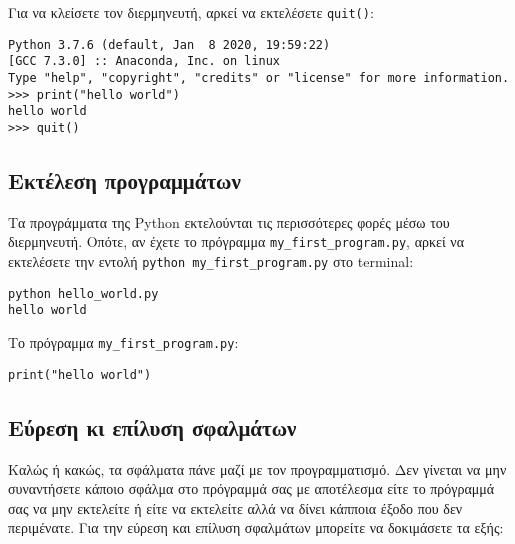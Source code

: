 \documentclass[12pt]{extreport}
\begin{document}
Για να κλείσετε τον διερμηνευτή, αρκεί να εκτελέσετε \lstinline{quit()}:

\begin{lstlisting}[numbers=none]
Python 3.7.6 (default, Jan  8 2020, 19:59:22) 
[GCC 7.3.0] :: Anaconda, Inc. on linux
Type "help", "copyright", "credits" or "license" for more information.
>>> print("hello world")
hello world
>>> quit()
\end{lstlisting}

\subsection{Εκτέλεση προγραμμάτων}

Τα προγράμματα της Python εκτελούνται τις περισσότερες φορές μέσω του διερμηνευτή. Οπότε, αν έχετε το πρόγραμμα \lstinline{my_first_program.py}, αρκεί να εκτελέσετε την εντολή \lstinline{python my_first_program.py} στο terminal:

\begin{lstlisting}[numbers=none]
python hello_world.py
hello world    
\end{lstlisting}

Το πρόγραμμα \lstinline{my_first_program.py}:
\begin{lstlisting}
print("hello world")
\end{lstlisting}

\subsection{Εύρεση κι επίλυση σφαλμάτων}

Καλώς ή κακώς, τα σφάλματα πάνε μαζί με τον προγραμματισμό. Δεν γίνεται να μην συναντήσετε κάποιο σφάλμα στο πρόγραμμά σας με αποτέλεσμα είτε το πρόγραμμά σας να μην εκτελείτε ή είτε να εκτελείτε αλλά να δίνει κάπποια έξοδο που δεν περιμένατε. Για την εύρεση και επίλυση σφαλμάτων μπορείτε να δοκιμάσετε τα εξής:
\end{document}
